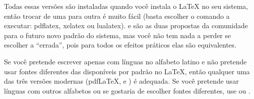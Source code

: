 Todas essas versões são instaladas quando você instala o \LaTeX{} no seu
sistema, então trocar de uma para outra é muito fácil (basta escolher o
comando a executar: pdflatex, xelatex ou lualatex). \XeLaTeX{} e
\LuaLaTeX{} são as duas propostas da comunidade para o futuro novo padrão
do sistema, mas você não tem nada a perder se escolher a ``errada'', pois
para todos os efeitos práticos elas são equivalentes.

Se você pretende escrever apenas com línguas no alfabeto latino e não
pretende usar fontes diferentes das disponíveis por padrão no \LaTeX{},
então qualquer uma das três versões modernas (pdf\LaTeX{}, \XeLaTeX{}
e \LuaLaTeX{}) é adequada. Se você pretende usar línguas com outros
alfabetos ou se gostaria de escolher fontes diferentes, use \XeLaTeX{}
ou \LuaLaTeX{}.
